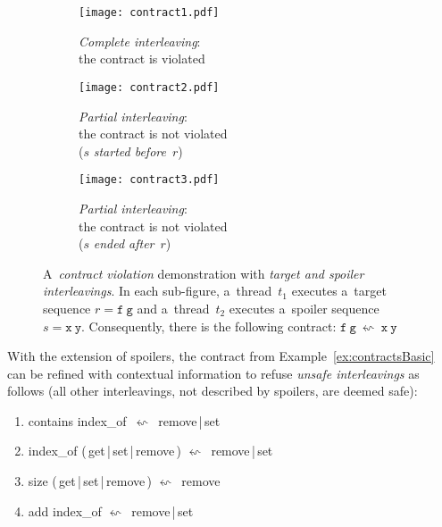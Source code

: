 \begin{figure}[hbt]
    \centering

    \begin{subfigure}[t]{.31 \linewidth}
        \centering
        \texttt{[image: contract1.pdf]}
        \caption{\emph{Complete interleaving}: \\ the contract is violated}
        \label{fig:contract1}
    \end{subfigure}
%
    \hfill
%
    \begin{subfigure}[t]{.31 \linewidth}
        \centering
        \texttt{[image: contract2.pdf]}
        \caption{\emph{Partial interleaving}: \\ the contract is not violated \\ ($ s $ \emph{started before}~$ r $)}
        \label{fig:contract2}
    \end{subfigure}
%
    \hfill
%
    \begin{subfigure}[t]{.31 \linewidth}
        \centering
        \texttt{[image: contract3.pdf]}
        \caption{\emph{Partial interleaving}: \\ the contract is not violated \\ ($ s $ \emph{ended after}~$ r $)}
        \label{fig:contract3}
    \end{subfigure}

    \caption{A~\emph{contract violation} demonstration with \emph{target and spoiler interleavings}. In each sub-figure, a~thread~$ t_1 $ executes a~target sequence $ r = \mathtt{f\ g} $ and a~thread~$ t_2 $ executes a~spoiler sequence $ s = \mathtt{x\ y} $. Consequently, there is the following contract: $ \mathtt{f\ g}\ \leftsquigarrow\ \mathtt{x\ y} $~\cite{muzikovskaBP}}
\end{figure}

\begin{example}
    With the extension of spoilers, the contract from Example~\ref{ex:contractsBasic} can be refined with contextual information to refuse \emph{unsafe interleavings} as follows (all other interleavings, not described by spoilers, are deemed  safe):
    \begin{enumerate}[label={($ \varrho^{\prime\prime}_{\arabic*} $)}]
        \tt

        \item contains index\_of\ $ \leftsquigarrow $\ remove\,|\,set

        \item index\_of (\,get\,|\,set\,|\,remove\,) $ \leftsquigarrow $\ remove\,|\,set

        \item size (\,get\,|\,set\,|\,remove\,) $ \leftsquigarrow $\ remove

        \item add index\_of $ \leftsquigarrow $\ remove\,|\,set
    \end{enumerate}
\end{example}

